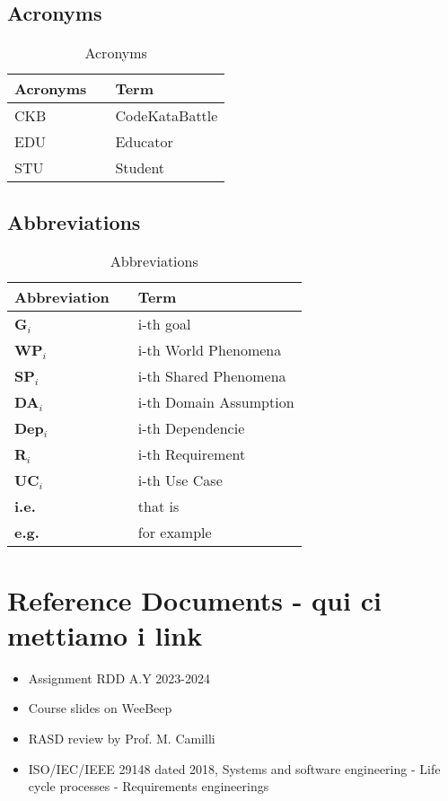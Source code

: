 \subsection{Acronyms}
\begin{table}[H]
    \centering
    \renewcommand{\arraystretch}{1.5}
    \begin{tabular}{l l p{11cm}}
        \hline
        \textbf{Acronyms} &  & \textbf{Term}  \\
        \hline
        CKB               &  & CodeKataBattle \\
        EDU               &  & Educator       \\
        STU               &  & Student        \\
        \hline
    \end{tabular}
    \caption{Acronyms}
\end{table}

\subsection{Abbreviations}
\begin{table}[H]
    \centering
    \renewcommand{\arraystretch}{1.5}
    \begin{tabular}{l l p{10.5cm}}
        \hline
        \textbf{Abbreviation} &  & \textbf{Term}          \\
        \hline
        \textbf{G}\(_i\)      &  & i-th goal              \\
        \textbf{WP}\(_i\)     &  & i-th World Phenomena   \\
        \textbf{SP}\(_i\)     &  & i-th Shared Phenomena  \\
        \textbf{DA}\(_i\)     &  & i-th Domain Assumption \\
        \textbf{Dep}\(_i\)    &  & i-th Dependencie       \\
        \textbf{R}\(_i\)      &  & i-th Requirement       \\
        \textbf{UC}\(_i\)     &  & i-th Use Case          \\
        \textbf{i.e.}         &  & that is                \\
        \textbf{e.g.}         &  & for example            \\
        \hline
    \end{tabular}
    \caption{Abbreviations}
\end{table}

{\color{red}\section{Reference Documents - qui ci mettiamo i link}}
\begin{itemize}
    \item Assignment RDD A.Y 2023-2024
    \item Course slides on WeeBeep
    \item RASD review by Prof. M. Camilli
    \item ISO/IEC/IEEE 29148 dated 2018, Systems and software engineering - Life cycle processes - Requirements engineerings
\end{itemize}

